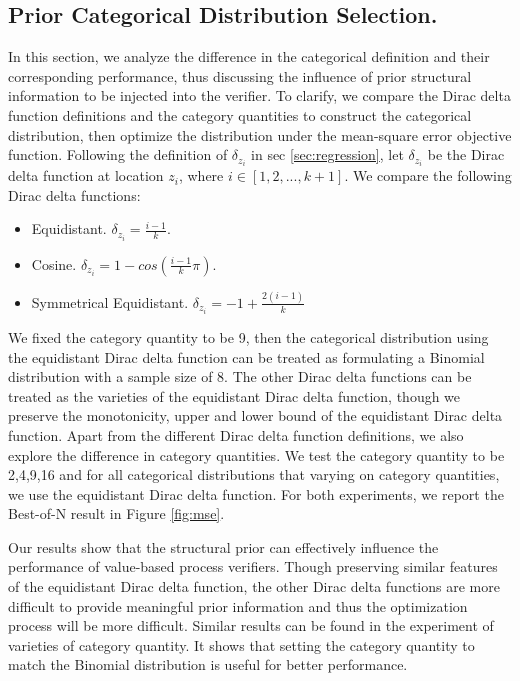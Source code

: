 \subsection{Prior Categorical Distribution Selection.}

In this section, we analyze the difference in the categorical definition and their corresponding performance, thus discussing the influence of prior structural information to be injected into the verifier. To clarify, we compare the Dirac delta function definitions and the category quantities to construct the categorical distribution, then optimize the distribution under the mean-square error objective function. Following the definition of $\delta_{z_i}$ in sec \ref{sec:regression}, let $\delta_{z_i}$ be the Dirac delta function at location $z_i$, where $i\in[1,2,...,k+1]$.  We compare the following Dirac delta functions:
\begin{itemize}
    \item Equidistant. $\delta_{z_i}=\frac{i-1}{k}$.
    \item Cosine. $\delta_{z_i}=1-cos(\frac{i-1}{k}\pi)$.
    \item Symmetrical Equidistant. $\delta_{z_i}=-1+\frac{2(i-1)}{k}$
\end{itemize}
We fixed the category quantity to be 9, then the categorical distribution using the equidistant Dirac delta function can be treated as formulating a Binomial distribution with a sample size of $8$. The other Dirac delta functions can be treated as the varieties of the equidistant Dirac delta function, though we preserve the monotonicity, upper and lower bound of the equidistant Dirac delta function. Apart from the different Dirac delta function definitions, we also explore the difference in category quantities. We test the category quantity to be {2,4,9,16} and for all categorical distributions that varying on category quantities, we use the equidistant Dirac delta function. For both experiments, we report the Best-of-N result in Figure \ref{fig:mse}.

Our results show that the structural prior can effectively influence the performance of value-based process verifiers. Though preserving similar features of the equidistant Dirac delta function, the other Dirac delta functions are more difficult to provide meaningful prior information and thus the optimization process will be more difficult. Similar results can be found in the experiment of varieties of category quantity. It shows that setting the category quantity to match the Binomial distribution is useful for better performance.


